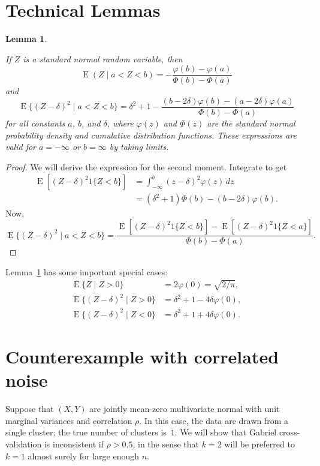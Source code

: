 \documentclass[11pt]{article}
\newtheorem{lemma}{Lemma}
\newcommand{\E}{\operatorname{E}}
\begin{document}
\section{Technical Lemmas}

\begin{lemma}\label{lem:truncated-normal-moments}

If $Z$ is a standard normal random variable, then
\[
  \E(Z \mid a < Z < b)
    = - \frac{\varphi(b) - \varphi(a)}
             {\Phi(b) - \Phi(a)}
\]
and
\[
  \E\{(Z - \delta)^2 \mid a < Z < b\}
    = \delta^2 + 1
    - \frac{  (b - 2 \delta) \varphi(b)
            - (a - 2 \delta) \varphi(a)}
           {\Phi(b) - \Phi(a)}
\]
for all constants $a$, $b$, and $\delta$, where
$\varphi(z)$ and $\Phi(z)$ are the standard normal probability density and
cumulative distribution functions.  These expressions are valid
for $a = -\infty$ or $b = \infty$ by taking limits.

\end{lemma}
\begin{proof}
We will derive the expression for the second moment.
Integrate to get
\begin{align*}
  \E[ (Z - \delta)^2 1\{Z < b\}]
    &= \int_{-\infty}^b (z - \delta)^2 \varphi(z) \, dz \\
    &= (\delta^2 + 1) \Phi(b) - (b - 2 \delta) \varphi(b).
\end{align*}
Now,
\[
  \E\{(Z - \delta)^2 \mid a < Z < b\}
    =
    \frac{  \E[ (Z - \delta)^2 1\{Z < b\}]
          - \E[ (Z - \delta)^2 1\{Z < a\}]}
         { \Phi(b) - \Phi(a) }.
\]
\end{proof}

Lemma~\ref{lem:truncated-normal-moments} has some important special cases:
\begin{align*}
  \E\{Z \mid Z > 0\} &= 2 \varphi(0) = \sqrt{2 / \pi}, \\
  \E\{(Z - \delta)^2 \mid Z > 0 \}
    &= \delta^2 + 1 - 4 \delta \varphi(0), \\
  \E\{(Z - \delta)^2 \mid Z < 0 \}
    &= \delta^2 + 1 + 4 \delta \varphi(0).
\end{align*}

\section{Counterexample with correlated noise}

Suppose that $(X, Y)$ are jointly mean-zero multivariate normal with unit
marginal variances and correlation $\rho$.  In this case, the data are drawn
from a single cluster; the true number of clusters is~$1$.  We will show that
Gabriel cross-validation is inconsistent if $\rho > 0.5$, in the sense that
$k = 2$ will be preferred to $k = 1$ almost surely for large enough $n$.
\end{document}
